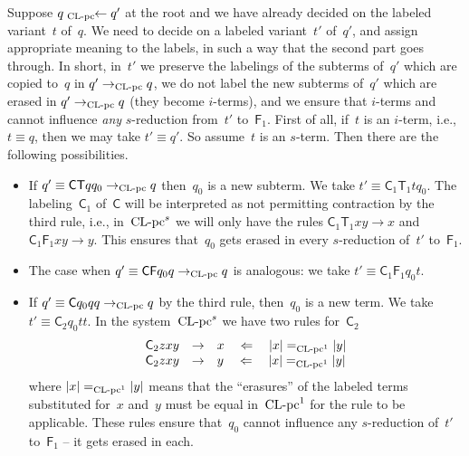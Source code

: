 \documentclass[a4paper,UKenglish]{lipics-v2016}
\newcommand{\Cs}{\mathsf{C}}
\newcommand{\Fs}{\mathsf{F}}
\newcommand{\Ts}{\mathsf{T}}
\newcommand{\from}{\ensuremath{\leftarrow}}
\newcommand{\From}{\ensuremath{\Leftarrow}}
\newcommand{\erase}[1]{\ensuremath{|#1|}}
\newcommand{\leftidx}[3]{{\;\vphantom{#2}}#1\!\!#2#3}
\newcommand{\CLC}{{\mbox{${\text{\rm CL-pc}^1}$}}}
\newcommand{\sCLC}{{\ensuremath{\text{\rm CL-pc}^1}}}
\newcommand{\sCLCz}{\ensuremath{\text{\rm CL-pc}}}
\newcommand{\CLCs}{{\mbox{${\text{\rm CL-pc}^s}$}}}
\begin{document}
Suppose $q \leftidx{{}_{\sCLCz}}{\from} q'$ at the root and we have
already decided on the labeled variant~$t$ of~$q$. We need to decide
on a labeled variant~$t'$ of~$q'$, and assign appropriate meaning to
the labels, in such a way that the second part goes through. In short,
in~$t'$ we preserve the labelings of the subterms of~$q'$ which are
copied to~$q$ in $q' \to_{\sCLCz} q$, we do not label the new subterms
of~$q'$ which are erased in $q' \to_{\sCLCz} q$ (they become
$i$-terms), and we ensure that $i$-terms and cannot influence
\emph{any} $s$-reduction from~$t'$ to~$\Fs_1$. First of all, if~$t$ is
an $i$-term, i.e., $t \equiv q$, then we may take $t' \equiv q'$. So
assume~$t$ is an $s$-term. Then there are the following possibilities.
\begin{itemize}
\item If $q' \equiv \Cs \Ts q q_0 \to_{\sCLCz} q$ then~$q_0$ is a new
  subterm. We take $t' \equiv \Cs_1 \Ts_1 t q_0$. The labeling~$\Cs_1$
  of~$\Cs$ will be interpreted as not permitting contraction by the
  third rule, i.e., in~$\CLCs$ we will only have the rules
  $\Cs_1 \Ts_1 x y \to x$ and $\Cs_1 \Fs_1 x y \to y$. This ensures
  that~$q_0$ gets erased in every $s$-reduction of~$t'$ to~$\Fs_1$.
\item The case when $q' \equiv \Cs \Fs q_0 q \to_{\sCLCz} q$ is
  analogous: we take $t' \equiv \Cs_1 \Fs_1 q_0 t$.
\item If $q' \equiv \Cs q_0 q q \to_{\sCLCz} q$ by the third rule,
  then~$q_0$ is a new term. We take $t' \equiv \Cs_2 q_0 t t$. In the
  system~$\CLCs$ we have two rules for~$\Cs_2$
  \[
  \begin{array}{rcl}
    \Cs_2 z x y &\to& x \quad\From\quad \erase{x} =_{\sCLC} \erase{y} \\
    \Cs_2 z x y &\to& y \quad\From\quad \erase{x} =_{\sCLC} \erase{y}
  \end{array}
  \]
  where $\erase{x} =_\sCLC \erase{y}$ means that the ``erasures'' of
  the labeled terms substituted for~$x$ and~$y$ must be equal
  in~$\CLC$ for the rule to be applicable. These rules ensure
  that~$q_0$ cannot influence any $s$-reduction of~$t'$ to~$\Fs_1$ --
  it gets erased in each.


\end{itemize}
\end{document}
